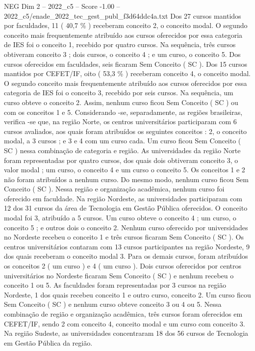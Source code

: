 \begin{textsample}{NEG Dim 2 – 2022\_c5 – Score -1.00 – 2022\_c5/enade\_2022\_tec\_gest\_publ\_f3d64ddc4a.txt}
Dos 27 cursos mantidos por faculdades, 11 ( 40,7 \% ) receberam conceito 2, o conceito modal.
O segundo conceito mais frequentemente atribuído aos cursos oferecidos por essa categoria de IES foi o conceito 1, recebido por quatro cursos.
Na sequência, três cursos obtiveram conceito 3 ; dois cursos, o conceito 4 ; e um curso, o conceito 5.
Dos cursos oferecidos em faculdades, seis ficaram Sem Conceito ( SC ).
Dos 15 cursos mantidos por CEFET/IF, oito ( 53,3 \% ) receberam conceito 4, o conceito modal.
O segundo conceito mais frequentemente atribuído aos cursos oferecidos por essa categoria de IES foi o conceito 3, recebido por seis cursos.
Na sequência, um curso obteve o conceito 2.
Assim, nenhum curso ficou Sem Conceito ( SC ) ou com os conceitos 1 e 5.
Considerando -se, separadamente, as regiões brasileiras, verifica -se que, na região Norte, os centros universitários participaram com 6 cursos avaliados, aos quais foram atribuídos os seguintes conceitos : 2, o conceito modal, a 3 cursos ; e 3 e 4 com um curso cada.
Um curso ficou Sem Conceito ( SC ) nessa combinação de categoria e região.
As universidades da região Norte foram representadas por quatro cursos, dos quais dois obtiveram conceito 3, o valor modal ; um curso, o conceito 4 e um curso o conceito 5.
Os conceitos 1 e 2 não foram atribuídos a nenhum curso.
Do mesmo modo, nenhum curso ficou Sem Conceito ( SC ).
Nessa região e organização acadêmica, nenhum curso foi oferecido em faculdade.
Na região Nordeste, as universidades participaram com 12 dos 31 cursos da área de Tecnologia em Gestão Pública oferecidos.
O conceito modal foi 3, atribuído a 5 cursos.
Um curso obteve o conceito 4 ; um curso, o conceito 5 ; e outros dois o conceito 2.
Nenhum curso oferecido por universidades no Nordeste recebeu o conceito 1 e três cursos ficaram Sem Conceito ( SC ).
Os centros universitários contaram com 13 cursos participantes na região Nordeste, 9 dos quais receberam o conceito modal 3.
Para os demais cursos, foram atribuídos os conceitos 2 ( um curso ) e 4 ( um curso ).
Dois cursos oferecidos por centros universitários no Nordeste ficaram Sem Conceito ( SC ) e nenhum recebeu o conceito 1 ou 5.
As faculdades foram representadas por 3 cursos na região Nordeste, 1 dos quais recebeu conceito 1 e outro curso, conceito 2.
Um curso ficou Sem Conceito ( SC ) e nenhum curso obteve conceito 3 ou 4 ou 5.
Nessa combinação de região e organização acadêmica, três cursos foram oferecidos em CEFET/IF, sendo 2 com conceito 4, conceito modal e um curso com conceito 3.
Na região Sudeste, as universidades concentraram 18 dos 56 cursos de Tecnologia em Gestão Pública da região.

\end{textsample}
